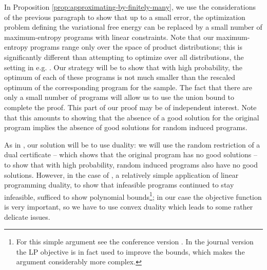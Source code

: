 \documentclass[final, 12pt]{colt2018}
\theoremstyle{definition}
\theoremstyle{plain}
\begin{document}
In Proposition \ref{prop:approximating-by-finitely-many}, we use the considerations of the previous paragraph to show that up to a small error, the optimization problem defining the variational free energy can be replaced by a small number of maximum-entropy programs  with linear constraints. Note that our maximum-entropy programs range only over the space of product distributions; this is significantly different than attempting to optimize over all distributions, the setting in e.g. \citep{singh-vishnoi}. Our strategy will be to show that with high probability, the optimum of each of these programs is not much smaller than the rescaled optimum of the corresponding program for the sample. The fact that there are only a small number of programs will allow us to use the union bound to complete the proof. This part of our proof may be of independent interest. Note that this amounts to showing that the absence of a good solution for the original program implies the absence of good solutions for random induced programs. 

As in \citep{alon-etal-samplingCSP}, our solution will be to use duality: we will use the random restriction of a dual certificate -- which shows that the original program has no good solutions -- to show that with high probability, random induced programs also have no good solutions. However, in the case of \citep{alon-etal-samplingCSP}, a relatively simple application of linear programming duality, to show that infeasible programs continued to stay infeasible, sufficed to show polynomial bounds\footnote{For this simple argument see the conference version \citep{alon-etal-samplingCSP-conference}. In the journal version the LP objective is in fact used to improve the bounds, which makes the argument considerably more complex.}; in our case the objective function is very important, so we have to use convex duality which leads to some rather delicate issues. 
\end{document}
